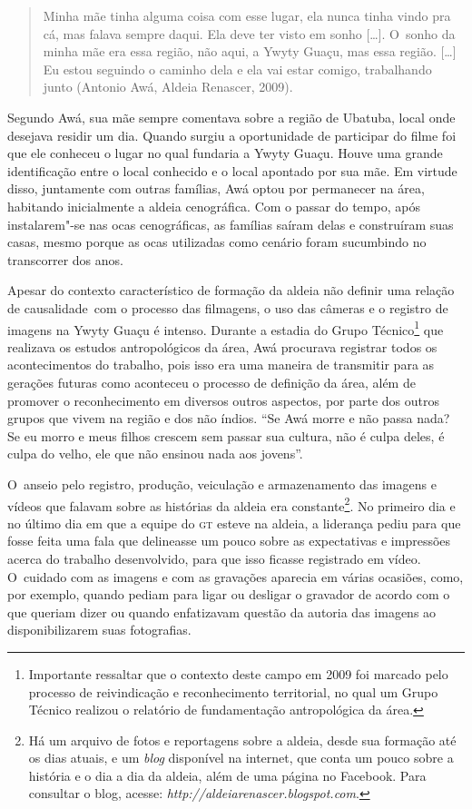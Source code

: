 \begin{quote}
\noindent
Minha mãe tinha alguma coisa com esse lugar, ela nunca tinha vindo pra
cá, mas falava sempre daqui. Ela deve ter visto em sonho [\ldots{}]. O~sonho
da minha mãe era essa região, não aqui, a Ywyty Guaçu, mas essa região.
[\ldots{}] Eu estou seguindo o caminho dela e ela vai estar comigo,
trabalhando junto (Antonio Awá, Aldeia Renascer, 2009).
\end{quote}

Segundo Awá, sua mãe sempre comentava sobre a região de Ubatuba, local
onde desejava residir um dia. Quando surgiu a oportunidade de
participar do filme foi que ele conheceu o lugar no qual fundaria a
Ywyty Guaçu. Houve uma grande identificação entre o local conhecido e o
local apontado por sua mãe. Em virtude disso, juntamente com outras
famílias, Awá optou por permanecer na área, habitando inicialmente a
aldeia cenográfica. Com o passar do tempo, após instalarem"-se nas ocas
cenográficas, as famílias saíram delas e construíram suas casas, mesmo
porque as ocas utilizadas como cenário foram sucumbindo no transcorrer
dos anos. 

Apesar do contexto característico de formação da aldeia não definir uma
relação de causalidade~com o processo das filmagens, o uso das câmeras
e o registro de imagens na Ywyty Guaçu é intenso. Durante a estadia do
Grupo Técnico\footnote{Importante ressaltar que o contexto deste campo
em 2009 foi marcado pelo processo de reivindicação e reconhecimento
territorial, no qual um Grupo Técnico realizou o relatório de
fundamentação antropológica da área.} que realizava os estudos
antropológicos da área, Awá procurava registrar todos os acontecimentos
do trabalho, pois isso era uma maneira de transmitir para as gerações
futuras como aconteceu o processo de definição da área, além de
promover o reconhecimento em diversos outros aspectos, por parte dos
outros grupos que vivem na região e dos não índios. ``Se Awá morre e não
passa nada? Se eu morro e meus filhos crescem sem passar sua cultura,
não é culpa deles, é culpa do velho, ele que não ensinou nada aos
jovens''. 

O~anseio pelo registro, produção, veiculação e armazenamento das imagens
e vídeos que falavam sobre as histórias da aldeia era
constante\footnote{Há um arquivo de fotos e reportagens sobre a
aldeia, desde sua formação até os dias atuais, e um \emph{blog} disponível na
internet, que conta um pouco sobre a história e o dia a dia da aldeia,
além de uma página no Facebook. Para consultar o blog, acesse:
\emph{http://aldeiarenascer.blogspot.com}.}. No
primeiro dia e no último dia em que a equipe do \textsc{gt} esteve na aldeia, a
liderança pediu para que fosse feita uma fala que delineasse um pouco
sobre as expectativas e impressões acerca do trabalho desenvolvido,
para que isso ficasse registrado em vídeo. O~cuidado com as imagens e
com as gravações aparecia em várias ocasiões, como, por exemplo, quando
pediam para ligar ou desligar o gravador de acordo com o que queriam
dizer ou quando enfatizavam questão da autoria das imagens ao
disponibilizarem suas fotografias.

